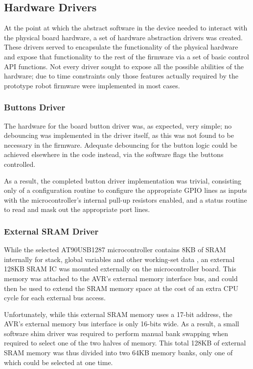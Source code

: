 \FloatBarrier
\subsection{Hardware Drivers}

At the point at which the abstract software in the device needed to interact with the physical board hardware, a set of hardware abstraction drivers was created. These drivers served to encapsulate the functionality of the physical hardware and expose that functionality to the rest of the firmware via a set of basic control API functions. Not every driver sought to expose all the possible abilities of the hardware; due to time constraints only those features actually required by the prototype robot firmware were implemented in most cases.

\FloatBarrier
\subsubsection{Buttons Driver}

The hardware for the board button driver was, as expected, very simple; no debouncing was implemented in the driver itself, as this was not found to be necessary in the firmware. Adequate debouncing for the button logic could be achieved elsewhere in the code instead, via the software flags the buttons controlled.

As a result, the completed button driver implementation was trivial, consisting only of a configuration routine to configure the appropriate GPIO lines as inputs with the microcontroller's internal pull-up resistors enabled, and a status routine to read and mask out the appropriate port lines.

\FloatBarrier
\subsubsection{External SRAM Driver}

While the selected AT90USB1287 microcontroller contains 8KB of SRAM internally for stack, global variables and other working-set data \cite{at90usb1287}, an external 128KB SRAM IC was mounted externally on the microcontroller board. This memory was attached to the AVR's external memory interface bus, and could then be used to extend the SRAM memory space at the cost of an extra CPU cycle for each external bus access.

Unfortunately, while this external SRAM memory uses a 17-bit address, the AVR's external memory bus interface is only 16-bits wide. As a result, a small software shim driver was required to perform manual bank swapping when required to select one of the two halves of memory. This total 128KB of external SRAM memory was thus divided into two 64KB memory banks, only one of which could be selected at one time.

